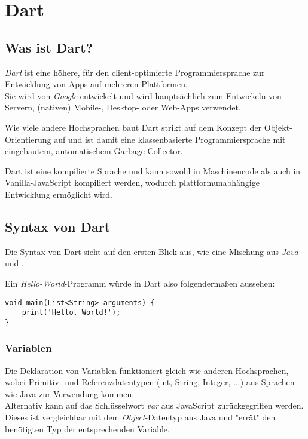 \section{Dart}

\subsection{Was ist Dart?}

\textit{Dart} ist eine höhere, für den client-optimierte Programmiersprache
zur Entwicklung von Apps auf mehreren Plattformen.\\
Sie wird von \textit{Google} entwickelt und wird hauptsächlich zum Entwickeln von
Servern, (nativen) Mobile-, Desktop- oder Web-Apps verwendet.

Wie viele andere Hochsprachen baut Dart strikt auf dem Konzept der Objekt-Orientierung auf
und ist damit eine klassenbasierte Programmiersprache mit eingebautem, automatischem
Garbage-Collector.

Dart ist eine kompilierte Sprache und kann sowohl in Maschinencode als auch in \\
Vanilla-JavaScript kompiliert werden, wodurch plattformunabhängige Entwicklung ermöglicht 
wird.

\subsection{Syntax von Dart}

Die Syntax von Dart sieht auf den ersten Blick aus, wie eine Mischung aus \textit{Java}\\
und .

Ein \textit{Hello-World}-Programm würde in Dart also folgendermaßen aussehen:
\begin{lstlisting}
void main(List<String> arguments) {
    print('Hello, World!');
}
\end{lstlisting}

\subsubsection{Variablen}

Die Deklaration von Variablen funktioniert gleich wie anderen Hochsprachen,
wobei Primitiv- und Referenzdatentypen (int, String, Integer, ...) aus Sprachen wie Java zur Verwendung
kommen.\\
Alternativ kann auf das Schlüsselwort \textit{var} aus JavaScript zurückgegriffen werden. Dieses
ist vergleichbar mit dem \textit{Object}-Datentyp aus Java und "errät" den benötigten
Typ der entsprechenden Variable.

